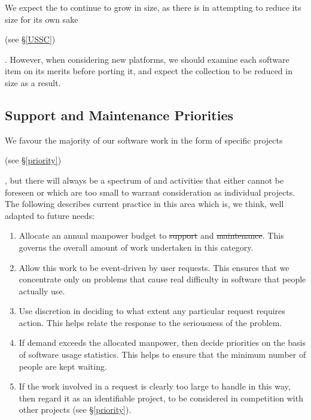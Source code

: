 We expect the  to continue
to grow in size, as there is  in
attempting to reduce its size for its own sake\begin{latexonly} (see
\S\ref{USSC})\end{latexonly}. However, when considering new platforms,
we should examine each software item on its merits before porting it,
and expect the collection to be reduced in size as a result.

\subsection{Support and Maintenance Priorities}

We favour  the majority of our
software work in the form of specific projects\begin{latexonly} (see
\S\ref{priority})\end{latexonly}, but there will always be a spectrum
of \st{} and \st{} activities that
either cannot be foreseen or which are too small to warrant
consideration as individual projects.  The following describes current
practice in this area which is, we think, well adapted to future
needs:

\begin{enumerate}
\item Allocate an annual manpower budget to  \st{support} and
\st{maintenance}. This governs the overall amount of work undertaken
in this category.

\item Allow this work to be event-driven by user requests. This
ensures that we concentrate only on problems that cause real
difficulty in software that people actually use.

\item Use discretion in deciding to what extent any particular request
requires action. This helps relate the response to the seriousness of
the problem.

\item If demand exceeds the allocated manpower, then decide priorities on
the basis of software usage statistics. This helps to ensure that the
minimum number of people are kept waiting.

\item If the work involved in a request is clearly too large to handle
in this way, then regard it as an identifiable project, to be
considered in competition with other projects (see \S\ref{priority}).

\end{enumerate}

